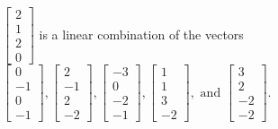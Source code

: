 \begin{exercise}
\begin{exerciseStatement}
  \end{exerciseStatement}
  \begin{exerciseAnswer}
   \(\left[\begin{array}{c}
2 \\
1 \\
2 \\
0
\end{array}\right]\) 
  	 is  
	a linear combination of the vectors \(\left[\begin{array}{c}
0 \\
-1 \\
0 \\
-1
\end{array}\right] , \left[\begin{array}{c}
2 \\
-1 \\
2 \\
-2
\end{array}\right] , \left[\begin{array}{c}
-3 \\
0 \\
-2 \\
-1
\end{array}\right] , \left[\begin{array}{c}
1 \\
1 \\
3 \\
-2
\end{array}\right] , \text{ and } \left[\begin{array}{c}
3 \\
2 \\
-2 \\
-2
\end{array}\right]\).

	
  


  \end{exerciseAnswer}
\end{exercise}